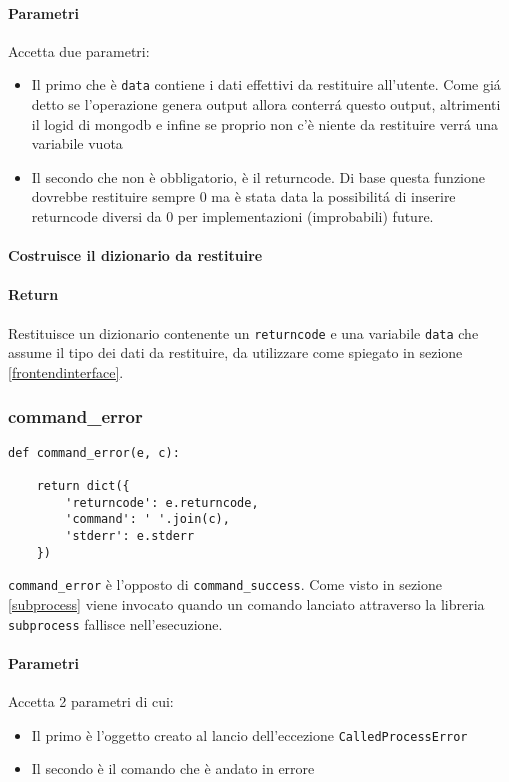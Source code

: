 \documentclass[11pt]{article}
\begin{document}
\paragraph{Parametri}
Accetta due parametri:
\begin{itemize}
	\item{Il primo che è \texttt{data} contiene i dati effettivi da restituire all'utente. Come gi\'a detto se l'operazione genera output
		allora conterr\'a questo output, altrimenti il logid di mongodb e infine se proprio non c'è niente da restituire verr\'a
		una variabile vuota}
	\item{Il secondo che non è obbligatorio, è il returncode. Di base questa funzione dovrebbe restituire sempre 0 ma è stata data
		la possibilit\'a di inserire returncode diversi da 0 per implementazioni (improbabili) future.}
\end{itemize}
\paragraph{Costruisce il dizionario da restituire}
\paragraph{Return}
Restituisce un dizionario contenente un \texttt{returncode} e una variabile \texttt{data} che assume il tipo dei dati da restituire,
da utilizzare come spiegato in sezione \ref{frontendinterface}.

\subsubsection{command\_error}\label{command\string_error}
\begin{lstlisting}
def command_error(e, c):

    return dict({
        'returncode': e.returncode,
        'command': ' '.join(c),
        'stderr': e.stderr
    })
\end{lstlisting}
\texttt{command\_error} è l'opposto di \texttt{command\_success}. Come visto in sezione \ref{subprocess} viene invocato quando
un comando lanciato attraverso la libreria \texttt{subprocess} fallisce nell'esecuzione.
\paragraph{Parametri}
Accetta 2 parametri di cui:
\begin{itemize}
	\item{Il primo è l'oggetto creato al lancio dell'eccezione \texttt{CalledProcessError}}
	\item{Il secondo è il comando che è andato in errore}
\end{itemize}
\end{document}
